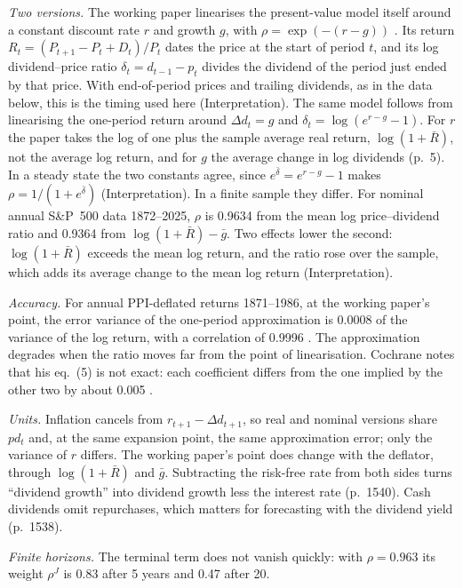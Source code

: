 \begin{qfresult}
 \emph{Two versions.} The working paper linearises the present-value model itself around a constant discount rate $r$ and growth $g$, with $\rho=\exp(-(r-g))$ \citep[NBER WP 2100, eqs.~(2)--(5), pp.~4--5]{campbell-shiller-1986-nber}. Its return $R_t=(P_{t+1}-P_t+D_t)/P_t$ dates the price at the start of period $t$, and its log dividend--price ratio $\delta_t=d_{t-1}-p_t$ divides the dividend of the period just ended by that price. With end-of-period prices and trailing dividends, as in the data below, this is the timing used here (Interpretation). The same model follows from linearising the one-period return around $\Delta d_t=g$ and $\delta_t=\log(e^{r-g}-1)$. For $r$ the paper takes the log of one plus the sample average real return, $\log(1+\bar R)$, not the average log return, and for $g$ the average change in log dividends (p.~5). In a steady state the two constants agree, since $e^{\bar\delta}=e^{r-g}-1$ makes $\rho=1/(1+e^{\bar\delta})$ (Interpretation). In a finite sample they differ. For nominal annual S\&P~500 data 1872--2025, $\rho$ is 0.9634 from the mean log price--dividend ratio and 0.9364 from $\log(1+\bar R)-\bar g$. Two effects lower the second: $\log(1+\bar R)$ exceeds the mean log return, and the ratio rose over the sample, which adds its average change to the mean log return (Interpretation).

\emph{Accuracy.} For annual PPI-deflated returns 1871--1986, at the working paper's point, the error variance of the one-period approximation is 0.0008 of the variance of the log return, with a correlation of 0.9996 \citep[Table~1a, p.~21]{campbell-shiller-1986-nber}. The approximation degrades when the ratio moves far from the point of linearisation. Cochrane notes that his eq.~(5) is not exact: each coefficient differs from the one implied by the other two by about 0.005 \citep[p.~1540]{wide-cochrane-dog}.

\emph{Units.} Inflation cancels from $r_{t+1}-\Delta d_{t+1}$, so real and nominal versions share $pd_t$ and, at the same expansion point, the same approximation error; only the variance of $r$ differs. The working paper's point does change with the deflator, through $\log(1+\bar R)$ and $\bar g$. Subtracting the risk-free rate from both sides turns ``dividend growth'' into dividend growth less the interest rate (p.~1540). Cash dividends omit repurchases, which matters for forecasting with the dividend yield (p.~1538).

\emph{Finite horizons.} The terminal term does not vanish quickly: with $\rho=0.963$ its weight $\rho^J$ is 0.83 after 5 years and 0.47 after 20.


\end{qfresult}
